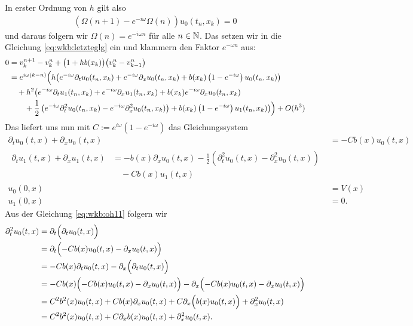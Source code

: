 In erster Ordnung von $h$ gilt also
\begin{align}
\left( \Omega(n+1) - e^{-i \omega} \Omega(n)  \right) u_0(t_n, x_k) = 0
\end{align}
und daraus folgern wir $\Omega(n) = e^{- i \omega n}$ für alle $n \in \mathbb N$.
Das setzen wir in die Gleichung \eqref{eq:wkb:letzteglg} ein und klammern den
Faktor $e^{- \omega n}$ aus:
\begin{align}
\begin{split}
0 &= v^{n+1}_k - v^n_k + \bigl(1 + hb(x_k)\bigr) \bigl( v^n_k - v^n_{k-1} \bigr)\\
&= e^{i \omega (k - n)} \Bigl(
h \bigl( e^{-i \omega} \partial_t u_0(t_n, x_k) + e^{-i \omega} \partial_x u_0(t_n, x_k) + b(x_k) \left(1-e^{-i \omega}\right) u_0(t_n, x_k) \bigr)\\
&\quad + h^2 \bigl( e^{-i \omega} \partial_t u_1(t_n, x_k) + e^{-i \omega} \partial_x u_1(t_n, x_k) + b(x_k) e^{-i \omega} \partial_x u_0(t_n, x_k)\\
&\qquad + \frac{1}{2} \left( e^{-i \omega} \partial^2_t u_0(t_n, x_k) - e^{-i \omega} \partial^2_x u_0(t_n, x_k) \right)  + b(x_k) \left(1-e^{-i \omega}\right) u_1(t_n, x_k) \bigr) 
\Bigr) + O(h^3)
\end{split}
\end{align}
Das liefert uns nun mit $C := e^{i \omega} \left(1-e^{-i \omega}\right)$ das Gleichungssystem
\begin{align}\label{eq:wkb:oh11}
\partial_t u_0(t, x) + \partial_x u_0(t, x) &= - C b(x) u_0(t, x)\\
\begin{split}\label{eq:wkb:oh22}
\partial_t u_1(t, x) + \partial_x u_1(t, x) &= - b(x) \partial_x u_0(t, x) - \frac{1}{2} \left( \partial^2_t u_0(t, x) - \partial^2_x u_0(t, x) \right)\\
&\quad - C b(x) u_1(t, x)
\end{split}\\
u_0(0,x) &= V(x)\\
u_1(0,x) &= 0.
\end{align}
Aus der Gleichung \eqref{eq:wkb:oh11} folgern wir
\begin{align*}
\partial^2_t u_0(t,x) &= \partial_t \Bigl( \partial_t u_0(t,x) \Bigr)\\
&= \partial_t \Bigl( -C b(x) u_0(t,x) - \partial_x u_0(t,x) \Bigr)\\
&= - C b(x) \partial_t u_0(t,x) - \partial_x \Bigl( \partial_t u_0(t,x)  \Bigr)\\
&= - C b(x) \Bigl( -C b(x) u_0(t,x) - \partial_x u_0(t,x) \Bigr) - \partial_x \Bigl( -C b(x) u_0(t,x) - \partial_x u_0(t,x) \Bigr)\\
&= C^2 b^2(x) u_0(t,x) + C b(x) \partial_x u_0(t,x) + C \partial_x \Bigl( b(x) u_0(t,x) \Bigr) + \partial^2_x u_0(t,x)\\
&= C^2 b^2(x) u_0(t,x) + C \partial_x b(x) u_0(t,x) + \partial^2_x u_0(t,x).
\end{align*}
